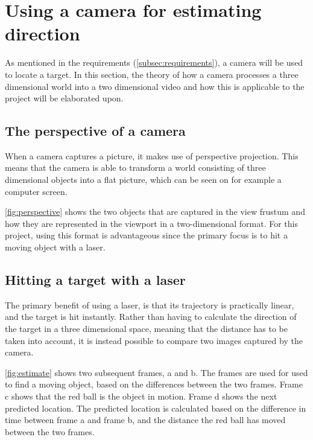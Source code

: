\section{Using a camera for estimating direction}
As mentioned in the requirements (\autoref{subsec:requirements}), a camera will be used to locate a target.
In this section, the theory of how a camera processes a three dimensional world into a two dimensional video and how this is applicable to the project will be elaborated upon.

\subsection{The perspective of a camera}
When a camera captures a picture, it makes use of perspective projection.
This means that the camera is able to transform a world consisting of three dimensional objects into a flat picture, which can be seen on for example a computer screen.


\autoref{fig:perspective} shows the two objects that are captured in the view frustum and how they are represented in the viewport in a two-dimensional format.
For this project, using this format is advantageous since the primary focus is to hit a moving object with a laser.

\subsection{Hitting a target with a laser}
The primary benefit of using a laser, is that its trajectory is practically linear, and the target is hit instantly.
Rather than having to calculate the direction of the target in a three dimensional space, meaning that the distance has to be taken into account, it is instead possible to compare two images captured by the camera.

\autoref{fig:estimate} shows two subsequent frames, a and b.
The frames are used for used to find a moving object, based on the differences between the two frames.
Frame c shows that the red ball is the object in motion.
Frame d shows the next predicted location.
The predicted location is calculated based on the difference in time between frame a and frame b, and the distance the red ball has moved between the two frames.

